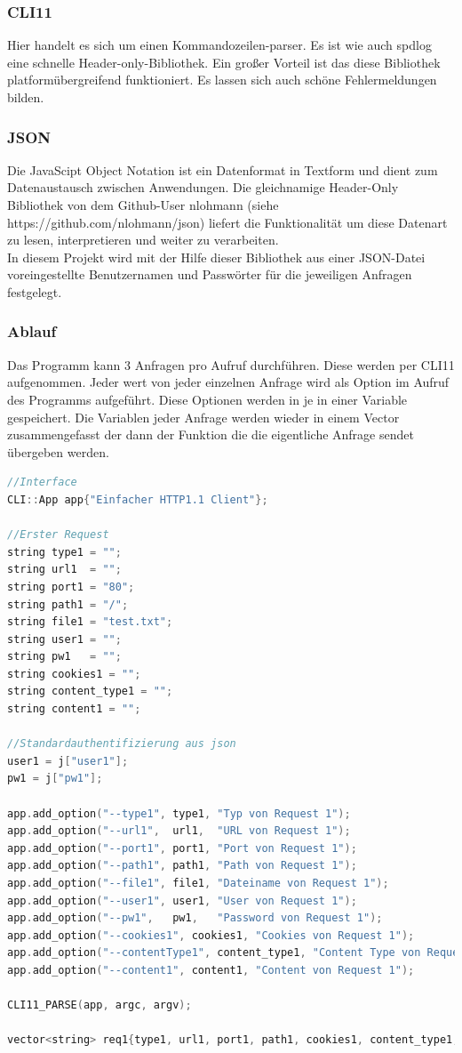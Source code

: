 \documentclass{article}
\begin{document}
\subsubsection{CLI11}
Hier handelt es sich um einen Kommandozeilen-parser. Es ist wie auch spdlog eine schnelle Header-only-Bibliothek. Ein großer Vorteil ist das diese Bibliothek platformübergreifend funktioniert. Es lassen sich auch schöne Fehlermeldungen bilden. 

\subsubsection{JSON}
Die JavaScipt Object Notation ist ein Datenformat in Textform und dient zum Datenaustausch zwischen Anwendungen. Die gleichnamige Header-Only Bibliothek von dem Github-User nlohmann (siehe https://github.com/nlohmann/json) liefert die Funktionalität um diese Datenart zu lesen, interpretieren und weiter zu verarbeiten.\\
In diesem Projekt wird mit der Hilfe dieser Bibliothek aus einer JSON-Datei voreingestellte Benutzernamen und Passwörter für die jeweiligen Anfragen festgelegt.

\subsubsection{Ablauf}
Das Programm kann 3 Anfragen pro Aufruf durchführen. Diese werden per CLI11 aufgenommen. Jeder wert von jeder einzelnen Anfrage wird als Option im Aufruf des Programms aufgeführt. Diese Optionen werden in je in einer Variable gespeichert. Die Variablen jeder Anfrage werden wieder in einem Vector zusammengefasst der dann der Funktion die die eigentliche Anfrage sendet übergeben werden. 

\begin{lstlisting}[language=C++]
//Interface
CLI::App app{"Einfacher HTTP1.1 Client"};

//Erster Request
string type1 = "";
string url1  = "";
string port1 = "80";
string path1 = "/";
string file1 = "test.txt";
string user1 = "";
string pw1   = "";
string cookies1 = "";
string content_type1 = "";
string content1 = "";

//Standardauthentifizierung aus json
user1 = j["user1"];
pw1 = j["pw1"];

app.add_option("--type1", type1, "Typ von Request 1");
app.add_option("--url1",  url1,  "URL von Request 1");
app.add_option("--port1", port1, "Port von Request 1");
app.add_option("--path1", path1, "Path von Request 1");
app.add_option("--file1", file1, "Dateiname von Request 1");
app.add_option("--user1", user1, "User von Request 1");
app.add_option("--pw1",   pw1,   "Password von Request 1");
app.add_option("--cookies1", cookies1, "Cookies von Request 1");
app.add_option("--contentType1", content_type1, "Content Type von Request 1");
app.add_option("--content1", content1, "Content von Request 1");

CLI11_PARSE(app, argc, argv);

vector<string> req1{type1, url1, port1, path1, cookies1, content_type1, content1, file1, user1, pw1};
\end{lstlisting}
\end{document}
